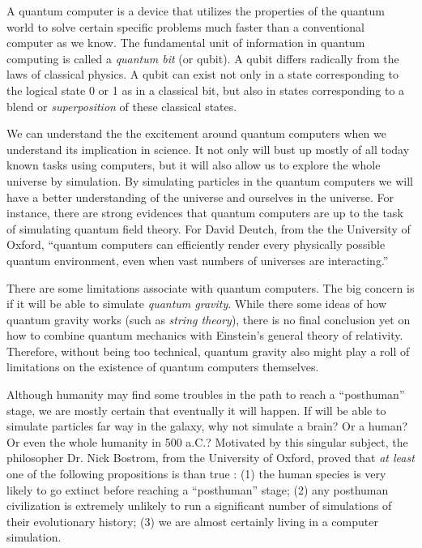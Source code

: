 \documentclass[twoside,11pt]{article}
\begin{document}
A quantum computer is a device that utilizes the properties of the quantum world to solve certain specific problems much faster than a conventional computer as we know.
The fundamental unit of information in quantum computing is called a \emph{quantum bit} (or qubit).
A qubit differs radically from the laws of classical physics.
A qubit can exist not only in a state corresponding to the logical state 0 or 1 as in a classical bit, but also in states corresponding to a blend or \emph{superposition} of these classical states.

We can understand the the excitement around quantum computers when we understand its implication in science.
It not only will bust up mostly of all today known tasks using computers, but it will also allow us to explore the whole universe by simulation.
By simulating particles in the quantum computers we will have a better understanding of the universe and ourselves in the universe.
For instance, there are strong evidences that quantum computers are up to the task of simulating quantum field theory.
For David Deutch, from the the University of Oxford, ``quantum computers can efficiently render every physically possible quantum environment, even when vast numbers of universes are interacting.''

There are some limitations associate with quantum computers.
The big concern is if it will be able to simulate \emph{quantum gravity}.
While there some ideas of how quantum gravity works (such as \emph{string theory}), there is no final conclusion yet on how to combine quantum mechanics with Einstein’s general theory of relativity.
Therefore, without being too technical, quantum gravity also might play a roll of limitations on the existence of quantum computers themselves.


Although humanity may find some troubles in the path to reach a ``posthuman'' stage, we are mostly certain that eventually it will happen.
If will be able to simulate particles far way in the galaxy, why not simulate a brain? Or a human? Or even the whole humanity in 500 a.C.?
Motivated by this singular subject, the philosopher Dr. Nick Bostrom, from the University of Oxford, proved that \emph{at least} one of the following propositions is than true \citep{bostrom2003we}:
(1) the human species is very likely to go extinct before reaching a ``posthuman'' stage; 
(2) any posthuman civilization is extremely unlikely to run a significant number of simulations of their evolutionary history; 
(3) we are almost certainly living in a computer simulation. 
\end{document}
